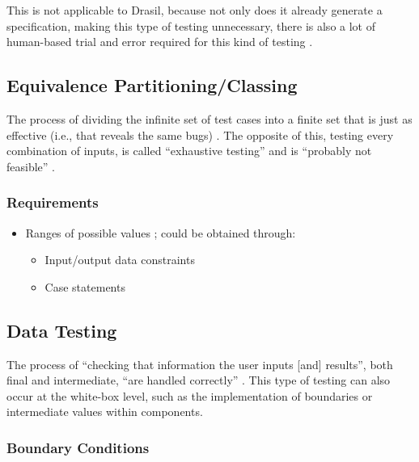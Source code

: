 This is not applicable to Drasil, because not only does it already generate a
specification, making this type of testing unnecessary, there is also a lot of
human-based trial and error required for this kind of testing
\citep{june_11_meeting}.

\subsection[Equivalence Partitioning/Classing]{Equivalence Partitioning/Classing
      \citep[pp.~67-69]{Patton2006}}

The process of dividing the infinite set of test cases into a finite set that is
just as effective (i.e., that reveals the same bugs) \citep[p.~67]{Patton2006}.
The opposite of this, testing every combination of inputs, is called
``exhaustive testing'' and is ``probably not feasible'' \exhInfCite{}.

\subsubsection{Requirements}
\begin{itemize}
      \item Ranges of possible values \citep[p.~67]{Patton2006};
            could be obtained through:
            \begin{itemize}
                  \item Input/output data constraints
                  \item Case statements
            \end{itemize}
\end{itemize}

\subsection[Data Testing]{Data Testing \citep[pp.~70-79]{Patton2006}}

The process of ``checking that information the user inputs [and] results'',
both final and intermediate, ``are handled correctly''
\citep[p.~70]{Patton2006}. This type of testing can also occur at the
white-box level, such as the implementation of boundaries
\citep[p.~431]{vanVliet2000} or intermediate values within
components.

\subsubsection[Boundary Conditions]{Boundary Conditions
      \citep[pp.~70-74]{Patton2006}}

